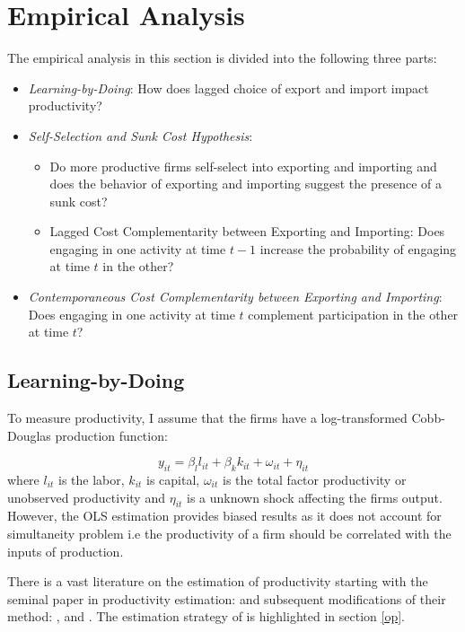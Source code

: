 \documentclass[12pt]{article}
\begin{document}
\section{Empirical Analysis}\label{sec:anal}

The empirical analysis in this section is divided into the  following three
parts:
\begin{itemize}
\item \textit{Learning-by-Doing}: How does lagged choice of export and import
  impact productivity?
\item \textit{Self-Selection and Sunk Cost Hypothesis}:
\begin{itemize}
\item  Do  more productive firms self-select into
  exporting and importing and does the behavior of exporting and
  importing suggest the presence of a sunk cost? 
\item Lagged Cost Complementarity between Exporting and Importing:
  Does  engaging in one activity at time $t-1$
  increase the probability of engaging at time $t$ in the other?
\end{itemize}
\item \textit{Contemporaneous Cost Complementarity between Exporting and Importing}: Does engaging
  in one activity at time $t$ complement participation in the other at
  time $t$?
\end{itemize}

\subsection{Learning-by-Doing}\label{sec:lbd}

 To measure productivity, I assume that the firms have a
 log-transformed Cobb-Douglas
production function: 

\begin{equation}
y_{it} =   \beta_{l}l_{it} + \beta_{k}k_{it} +
\omega_{it} + \eta_{it} 
\end{equation}
where $l_{it}$ is the labor, $k_{it}$ is capital, $\omega_{it}$ is the
total factor productivity or unobserved productivity and $\eta_{it}$
is a unknown shock affecting the firms output. However, the OLS
estimation provides biased results as it does not account for
simultaneity problem i.e the productivity of a firm should be
correlated with the inputs of production. 

There is a vast literature on the estimation of productivity starting
with the seminal paper in productivity estimation: \textcite{olley1992dynamics} and subsequent
modifications of their method: \textcite{levinsohn2003estimating},
\textcite{ackerberg2006structural} and
\textcite{wooldridge2009estimating}. The estimation strategy of
\textcite{olley1992dynamics} is highlighted in section \ref{op}. 
\end{document}
